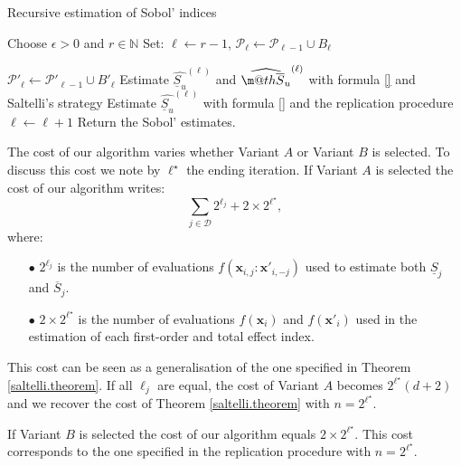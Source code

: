 \documentclass[]{elsarticle}
\makeatletter
\theoremstyle{definition}
\newcommand{\bvec}[1]{\boldsymbol{#1}}
\newcommand{\vx}{\bvec{x}}
\newcommand*{\ov}[1]{
  \m@th\overline{\mbox{#1}\raisebox{2mm}{}}
}
\def\abs#1{\ensuremath{\left \lvert #1 \right \rvert}}
\makeatother
\begin{document}
\begin{algorithm}[!ht]
\caption{Recursive estimation of Sobol' indices}
\begin{algorithmic}[1]
\vspace*{0.2cm}
\State Choose $\epsilon >0$ and $r \in \mathbb{N}$
\State Set: $\ell \leftarrow r-1$, 
\While {$\abs{\varepsilon_{S_u}} \leq \epsilon$}
\State $\mathcal{P}_\ell \leftarrow \mathcal{P}_{\ell-1} \cup B_\ell$

\hspace*{-0.3cm} $\mathcal{P}'_\ell \leftarrow \mathcal{P}'_{\ell-1} \cup {B'}_\ell$
\State Estimate $\widehat{\underline{S}_u}^{(\ell)}$ and $\widehat{\ov{$S$}_u}^{(\ell)}$ with formula \ref{} and Saltelli's strategy
\EndIf
{}
\State Estimate $\widehat{\underline{S}_u}^{(\ell)}$ with formula \ref{} and the replication procedure
\EndIf
\EndFor
\State $\ell \leftarrow \ell + 1$
\EndWhile
\State Return the Sobol' estimates.
\end{algorithmic}
\label{recursive.algorithm}
\end{algorithm}

The cost of our algorithm varies whether Variant $A$ or Variant $B$ is selected. To discuss this cost we note by $\ell^\star$ the ending iteration. If Variant $A$ is selected the cost of our algorithm writes:
\begin{equation*}
\sum \limits_{j \in \mathcal{D}} 2^{\ell_j} + 2 \times 2^{\ell^{\star}},
\end{equation*}
where: 
\begin{itemize}
\item[$\bullet$] $2^{\ell_j}$ is the number of evaluations $f\left(\vx_{i,j}:{\vx'}_{i,-j}\right)$ used to estimate both $\underline{S}_j$ and $\overline{S}_j$.
\item[$\bullet$] $2 \times 2^{\ell^{\star}}$ is the number of evaluations $f\left(\vx_{i}\right)$ and $f\left({\vx'}_{i}\right)$ used in the estimation of each first-order and total effect index.
\end{itemize}
This cost can be seen as a generalisation of the one specified in Theorem \ref{saltelli.theorem}. If all $\ell_j$ are equal, the cost of Variant $A$ becomes $2^{\ell^\star}(d+2)$ and we recover the cost of Theorem \ref{saltelli.theorem} with $n=2^{\ell^\star}$.

If Variant $B$ is selected the cost of our algorithm equals $2 \times 2^{\ell^{\star}}$. This cost corresponds to the one specified in the replication procedure with $n=2^{\ell^{\star}}$.
\end{document}
